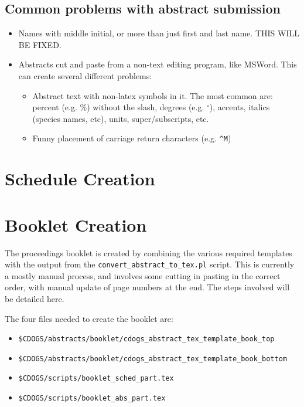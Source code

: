 \documentclass[letterpaper,12pt]{article}
\begin{document}
\subsection{Common problems with abstract submission}

\begin{itemize}
\item Names with middle initial, or more than just first and last
  name. THIS WILL BE FIXED.
\item Abstracts cut and paste from a non-text editing program, like
  MSWord. This can create several different problems:
  \begin{itemize}
  \item Abstract text with non-latex symbols in it. The most common
    are: percent (e.g. $\%$) without the slash, degrees
    (e.g. $^{\circ}$), accents, italics (species names, etc), units,
    super/subscripts, etc.
  \item Funny placement of carriage return characters (e.g. \verb|^M|)
  \end{itemize}

\end{itemize}

\section{Schedule Creation}

\section{Booklet Creation}

The proceedings booklet is created by combining the various required
templates with the output from the \verb|convert_abstract_to_tex.pl|
script. This is currently a mostly manual process, and involves some
cutting in pasting in the correct order, with manual update of page
numbers at the end. The steps involved will be detailed here.

The four files needed to create the booklet are:
\begin{itemize}
\item \verb|$CDOGS/abstracts/booklet/cdogs_abstract_tex_template_book_top|
\item \verb|$CDOGS/abstracts/booklet/cdogs_abstract_tex_template_book_bottom|
\item \verb|$CDOGS/scripts/booklet_sched_part.tex|
\item \verb|$CDOGS/scripts/booklet_abs_part.tex|
\end{itemize}
\end{document}
